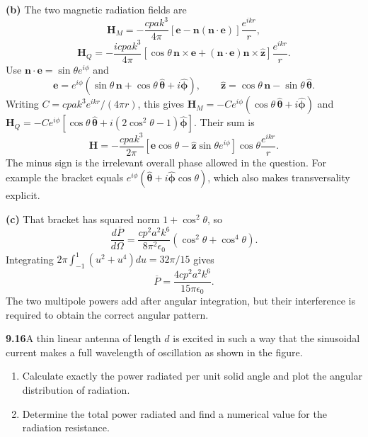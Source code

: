 \textbf{(b)} The two magnetic radiation fields are
\[
\mathbf H_M=-\frac{cpak^3}{4\pi}
[\mathbf e-\mathbf n(\mathbf n\cdot\mathbf e)]\frac{e^{ikr}}r,
\]
\[
\mathbf H_Q=-\frac{icpak^3}{4\pi}
[\cos\theta\,\mathbf n\times\mathbf e+
(\mathbf n\cdot\mathbf e)\mathbf n\times\hat{\mathbf z}]
\frac{e^{ikr}}r.
\]
Use $\mathbf n\cdot\mathbf e=\sin\theta e^{i\phi}$ and
\[
\mathbf e=e^{i\phi}(\sin\theta\,\mathbf n+\cos\theta\,
\hat{\boldsymbol\theta}+i\hat{\boldsymbol\phi}),\qquad
\hat{\mathbf z}=\cos\theta\,\mathbf n-\sin\theta\,
\hat{\boldsymbol\theta}.
\]
Writing $C=cpak^3e^{ikr}/(4\pi r)$, this gives
$\mathbf H_M=-Ce^{i\phi}(\cos\theta\,\hat{\boldsymbol\theta}
+i\hat{\boldsymbol\phi})$ and
$\mathbf H_Q=-Ce^{i\phi}[\cos\theta\,\hat{\boldsymbol\theta}
+i(2\cos^2\theta-1)\hat{\boldsymbol\phi}]$. Their sum is
\[
\boxed{\mathbf H=-\frac{cpak^3}{2\pi}
[\mathbf e\cos\theta-\hat{\mathbf z}\sin\theta e^{i\phi}]
\cos\theta\frac{e^{ikr}}r.}
\]
The minus sign is the irrelevant overall phase allowed in the question.
For example the bracket equals
$e^{i\phi}(\hat{\boldsymbol\theta}+i\hat{\boldsymbol\phi}\cos\theta)$,
which also makes transversality explicit.

\textbf{(c)} That bracket has squared norm $1+\cos^2\theta$, so
\[
\frac{d\overline P}{d\Omega}
=\frac{cp^2a^2k^6}{8\pi^2\epsilon_0}
(\cos^2\theta+\cos^4\theta).
\]
Integrating $2\pi\int_{-1}^1(u^2+u^4)du=32\pi/15$ gives
\[
\boxed{\overline P=\frac{4cp^2a^2k^6}{15\pi\epsilon_0}.}
\]
The two multipole powers add after angular integration, but their
interference is required to obtain the correct angular pattern.

\par\bigskip
\noindent\textbf{9.16}\quad A thin linear antenna of length $d$ is excited in such a way that the sinusoidal current makes a full wavelength of oscillation as shown in the figure.

\begin{center}
\end{center}

\begin{enumerate}
\item[(a)] Calculate exactly the power radiated per unit solid angle and plot the angular distribution of radiation.
\item[(b)] Determine the total power radiated and find a numerical value for the radiation resistance.
\end{enumerate}
\solution


